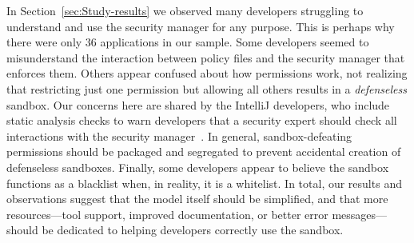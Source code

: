 \documentclass{sig-alternate}
\begin{document}
In Section~\ref{sec:Study-results} we observed many developers struggling to understand and
use the security manager for any purpose. This is perhaps why there
were only 36 applications in our sample. Some developers seemed to
misunderstand the interaction between policy files and the security
manager that enforces them. Others appear confused
about how permissions work, not realizing that
restricting just one permission but allowing all others results in a
\emph{defenseless} sandbox.  Our concerns here are shared by the IntelliJ developers,
who include static analysis checks to warn developers that a security expert
should check all interactions with the security
manager~\cite{intelliJ}.  In general, sandbox-defeating permissions
should be packaged and segregated to prevent accidental creation of
defenseless sandboxes. Finally, some developers appear to believe
the sandbox functions as a blacklist when, in reality, it is a whitelist.
In total, our results and observations suggest that the model itself should be simplified, and
that more resources---tool support, improved
documentation, or better error messages---should be dedicated to helping
developers correctly use the sandbox.



\end{document}
